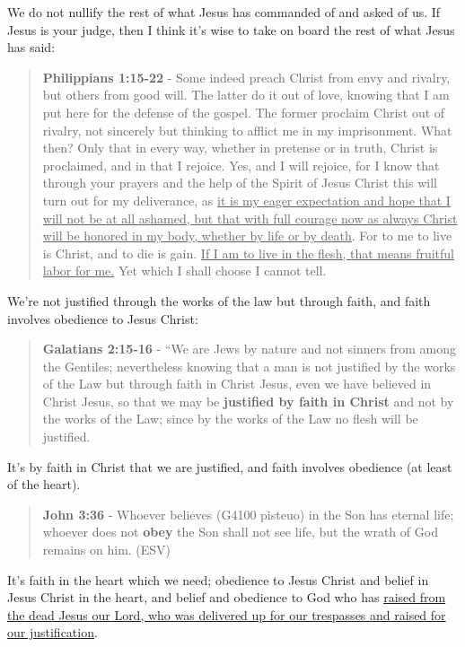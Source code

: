 \documentclass[11pt]{article}
\begin{document}
We do not nullify the rest of what Jesus has commanded of and asked of us. If Jesus is your judge, then I think it's wise to take on board the rest of what Jesus has said:

\begin{quote}
\textbf{Philippians 1:15-22} - Some indeed preach Christ from envy and rivalry, but others from good will. The latter do it out of love, knowing that I am put here for the defense of the gospel. The former proclaim Christ out of rivalry, not sincerely but thinking to afflict me in my imprisonment. What then? Only that in every way, whether in pretense or in truth, Christ is proclaimed, and in that I rejoice. Yes, and I will rejoice, for I know that through your prayers and the help of the Spirit of Jesus Christ this will turn out for my deliverance, as \uline{it is my eager expectation and hope that I will not be at all ashamed, but that with full courage now as always Christ will be honored in my body, whether by life or by death}. For to me to live is Christ, and to die is gain. \uline{If I am to live in the flesh, that means fruitful labor for me.} Yet which I shall choose I cannot tell.
\end{quote}

We're not justified through the works of the law but through faith, and faith involves obedience to Jesus Christ:

\begin{quote}
\textbf{Galatians 2:15-16} - “We are Jews by nature and not sinners from among the Gentiles; nevertheless knowing that a man is not justified by the works of the Law but through faith in Christ Jesus, even we have believed in Christ Jesus, so that we may be \textbf{justified by faith in Christ} and not by the works of the Law; since by the works of the Law no flesh will be justified.
\end{quote}

It's by faith in Christ that we are justified, and faith involves obedience (at least of the heart).

\begin{quote}
\textbf{John 3:36} - Whoever believes (G4100 pisteuo) in the Son has eternal life; whoever does not \textbf{obey} the Son shall not see life, but the wrath of God remains on him. (ESV)
\end{quote}

It's faith in the heart which we need; obedience to Jesus Christ and belief in Jesus Christ in the heart, and belief and obedience to God who has \uline{raised from the dead Jesus our Lord, who was delivered up for our trespasses and raised for our justification}.
\end{document}
